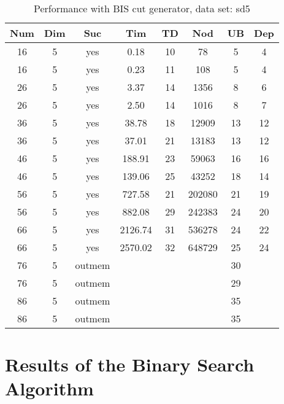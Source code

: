 \begin{table}[!htb]
  \centering
  \begin{tabular}[center]{|c|c|c|c|c|c|c|c|}
    \hline
    Num & Dim & Suc & Tim & TD & Nod & UB & Dep \\
    \hline
    16 & 5 & yes & 0.18 & 10 & 78 & 5 & 4 \\
    16 & 5 & yes & 0.23 & 11 & 108 & 5 & 4 \\
    26 & 5 & yes & 3.37 & 14 & 1356 & 8 & 6 \\
    26 & 5 & yes & 2.50 & 14 & 1016 & 8 & 7 \\
    36 & 5 & yes & 38.78 & 18 & 12909 & 13 & 12 \\
    36 & 5 & yes & 37.01 & 21 & 13183 & 13 & 12 \\
    46 & 5 & yes & 188.91 & 23 & 59063 & 16 & 16 \\
    46 & 5 & yes & 139.06 & 25 & 43252 & 18 & 14 \\
    56 & 5 & yes & 727.58 & 21 & 202080 & 21 & 19 \\
    56 & 5 & yes & 882.08 & 29 & 242383 & 24 & 20 \\
    66 & 5 & yes & 2126.74 & 31 & 536278 & 24 & 22 \\
    66 & 5 & yes & 2570.02 & 32 & 648729 & 25 & 24 \\
    76 & 5 & outmem &&&& 30 &\\
    76 & 5 & outmem &&&& 29 &\\
    86 & 5 & outmem &&&& 35 &\\
    86 & 5 & outmem &&&& 35 &\\
    \hline
  \end{tabular}
  \caption{Performance with BIS cut generator, data set: sd5}
  \label{tab:test.cutbis-sd5}
\end{table}




\clearpage
\section{Results of the Binary Search Algorithm}
\label{sec:apd.bin}

